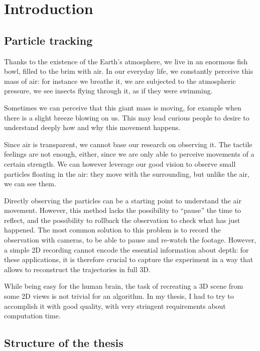 \chapter{Introduction}
\label{chap:intr}

\section{Particle tracking}

Thanks to the existence of the Earth's atmosphere, we live in an enormous fish bowl, filled to the brim with air.
In our everyday life, we constantly perceive this mass of air: for instance we breathe it, we are subjected to the atmospheric pressure, we see insects flying through it, as if they were swimming.

Sometimes we can perceive that this giant mass is moving, for example when there is a slight breeze blowing on us.
This may lead curious people to desire to understand deeply how and why this movement happens.

Since air is transparent, we cannot base our research on observing it.
The tactile feelings are not enough, either, since we are only able to perceive movements of a certain strength.
We can however leverage our good vision to observe small particles floating in the air: they move with the surrounding, but unlike the air, we can see them.

Directly observing the particles can be a starting point to understand the air movement.
However, this method lacks the possibility to ``pause'' the time to reflect, and the possibility to rollback the observation to check what has just happened.
The most common solution to this problem is to record the observation with cameras, to be able to pause and re-watch the footage.
However, a simple 2D recording cannot encode the essential information about depth: for these applications, it is therefore crucial to capture the experiment in a way that allows to reconstruct the trajectories in full 3D.

While being easy for the human brain, the task of recreating a 3D scene from some 2D views is not trivial for an algorithm.
In my thesis, I had to try to accomplish it with good quality, with very stringent requirements about computation time.

\section{Structure of the thesis}

